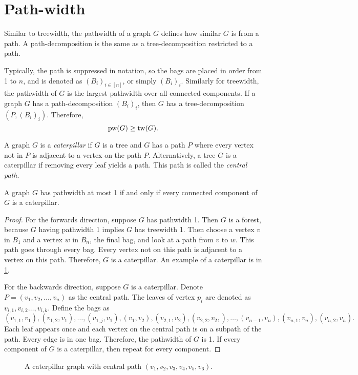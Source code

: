 \section{Path-width}\label{sec:Pathwidth}
Similar to treewidth, the pathwidth of a graph \(G\) defines how similar $G$ is from a path. A path-decomposition is the same as a tree-decomposition restricted to a path. 

Typically, the path is suppressed in notation, so the bags are placed in order from 1 to $n$, and is denoted as $(B_i)_{i \in [n]}$, or simply $(B_i)_i$. Similarly for treewidth, the pathwidth of \(G\) is the largest pathwidth over all connected components.
If a graph $G$ has a path-decomposition \({(B_i)}_i\), then $G$ has a tree-decomposition \(\left(P,{(B_i)}_i\right)\). Therefore,
\begin{equation*}
	\operatorname{pw}(G) \geq \operatorname{tw}(G).
\end{equation*}

A graph \(G\) is a \textit{caterpillar} if \(G\) is a tree and $G$ has a path \(P\) where every vertex not in $P$ is adjacent to a vertex on the path \(P\). Alternatively, a tree \(G\) is a caterpillar if removing every leaf yields a path. This path is called the \textit{central path}.
\begin{proposition}
	A graph $G$ has pathwidth at most 1 if and only if every connected component of $G$ is a caterpillar.
\end{proposition}
\begin{proof}
	For the forwards direction, suppose \(G\) has pathwidth 1. Then $G$ is a forest, because $G$ having pathwidth 1 implies $G$ has treewidth 1. Then choose a vertex \(v\) in \(B_1\) and a vertex \(w\) in \(B_n\), the final bag, and look at a path from \(v\) to \(w\). This path goes through every bag. Every vertex not on this path is adjacent to a vertex on this path. Therefore, $G$ is a caterpillar. 
	An example of a caterpillar is in \cref{fig:caterpillar}.

	For the backwards direction, suppose \(G\) is a caterpillar.
	Denote \(P =\left( v_1, v_2, \ldots, v_n\right)\) as the central path. The leaves of vertex \(p_i\) are denoted as \(v_{i, 1}, v_{i, 2} \dots, v_{i, k}\). Define the bags as
	\begin{equation*}
		(v_{1, 1}, v_1), (v_{1, 2}, v_1) ,\ldots ,(v_{1, j}, v_1),  (v_1, v_2), (v_{2, 1}, v_2), (v_{2,2}, v_2,),\ldots ,(v_{n-1}, v_n), (v_{n,1}, v_n), (v_{n,2}, v_n) .
	\end{equation*}
	Each leaf appears once and each vertex on the central path is on a subpath of the path. Every edge is in one bag. Therefore, the pathwidth of \(G\) is 1. If every component of $G$ is a caterpillar, then repeat for every component.
\end{proof}
\begin{figure}[h!]
	\centering
	
	\caption[Caterpillar graph]{A caterpillar graph with central path \((v_1, v_2, v_3, v_4, v_5, v_6)\).}\label{fig:caterpillar}
\end{figure}

